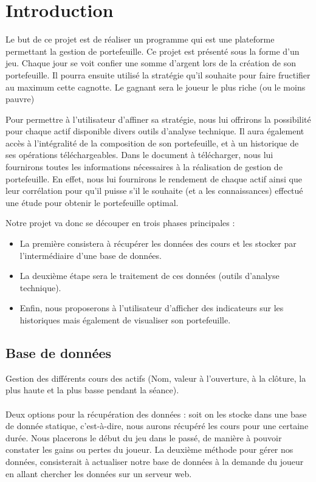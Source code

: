 \section{Introduction}

Le but de ce projet est de réaliser un programme qui est une plateforme permettant la gestion de portefeuille. Ce projet est présenté sous la forme d'un jeu. Chaque jour se voit confier une somme d'argent lors de la création de son portefeuille. Il pourra ensuite utilisé la stratégie qu'il souhaite pour faire fructifier au maximum cette cagnotte. Le gagnant sera le joueur le plus riche (ou le moins pauvre)

Pour permettre à l'utilisateur d'affiner sa stratégie, nous lui offrirons la possibilité pour chaque actif disponible divers outils d’analyse technique. Il aura également accès à l'intégralité de la composition de son portefeuille, et à un historique de ses opérations téléchargeables. Dans le document à télécharger, nous lui fournirons toutes les informations nécessaires à la réalisation de gestion de portefeuille. En effet, nous lui fournirons le rendement de chaque actif ainsi que leur corrélation pour qu'il puisse s'il le souhaite (et a les connaissances) effectué une étude pour obtenir le portefeuille optimal.


Notre projet va donc se découper en trois phases principales : 
\begin{itemize}
\item La première consistera à récupérer les données des cours et les stocker par l’intermédiaire d’une base de données.
\item La deuxième étape sera le traitement de ces données (outils d’analyse technique).
\item Enfin, nous proposerons à l’utilisateur d'afficher des indicateurs sur les historiques mais également de visualiser son portefeuille. 
\end{itemize}



\subsection{Base de données}
Gestion des différents cours des actifs (Nom, valeur à l’ouverture, à la clôture, la plus haute et la plus basse pendant la séance). \\ \\ 
Deux options pour la récupération des données : soit on les stocke dans une base de donnée statique, c’est-à-dire, nous aurons récupéré les cours pour une certaine durée. Nous placerons le début du jeu dans le passé, de manière à pouvoir constater les gains ou pertes du joueur. La deuxième méthode pour gérer nos données, consisterait à actualiser notre base de données à la demande du joueur en allant chercher les données sur un serveur web. 

